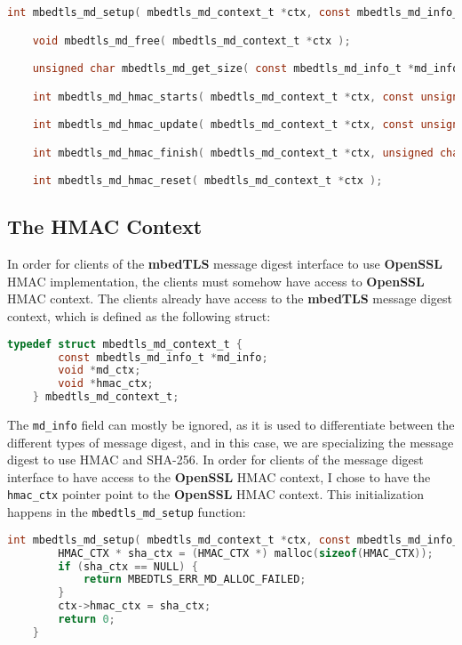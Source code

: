 \documentclass[pageno]{jpaper}
\newcommand{\stdtitle}[1]{\textbf{#1}}
\begin{document}
\begin{lstlisting}[language=C]
    int mbedtls_md_setup( mbedtls_md_context_t *ctx, const mbedtls_md_info_t *md_info, int hmac );

    void mbedtls_md_free( mbedtls_md_context_t *ctx );

    unsigned char mbedtls_md_get_size( const mbedtls_md_info_t *md_info );

    int mbedtls_md_hmac_starts( mbedtls_md_context_t *ctx, const unsigned char *key, size_t keylen );

    int mbedtls_md_hmac_update( mbedtls_md_context_t *ctx, const unsigned char *input, size_t ilen );

    int mbedtls_md_hmac_finish( mbedtls_md_context_t *ctx, unsigned char *output);

    int mbedtls_md_hmac_reset( mbedtls_md_context_t *ctx );
\end{lstlisting}

\subsection{The HMAC Context}

In order for clients of the \stdtitle{mbedTLS} message digest interface to use \stdtitle{OpenSSL} HMAC implementation, the clients must somehow have access to \stdtitle{OpenSSL} HMAC context. The clients already have access to the \stdtitle{mbedTLS} message digest context, which is defined as the following struct:

\begin{lstlisting}[language=C]
    typedef struct mbedtls_md_context_t {
        const mbedtls_md_info_t *md_info;
        void *md_ctx;
        void *hmac_ctx;
    } mbedtls_md_context_t;
\end{lstlisting}

The \lstinline{md_info} field can mostly be ignored, as it is used to differentiate between the different types of message digest, and in this case, we are specializing the message digest to use HMAC and SHA-256. In order for clients of the message digest interface to have access to the \stdtitle{OpenSSL} HMAC context, I chose to have the \lstinline{hmac_ctx} pointer point to the \stdtitle{OpenSSL} HMAC context. This initialization happens in the \lstinline{mbedtls_md_setup} function:

\begin{lstlisting}[language=C]
    int mbedtls_md_setup( mbedtls_md_context_t *ctx, const mbedtls_md_info_t *md_info, int hmac ) {
        HMAC_CTX * sha_ctx = (HMAC_CTX *) malloc(sizeof(HMAC_CTX));
        if (sha_ctx == NULL) {
            return MBEDTLS_ERR_MD_ALLOC_FAILED;
        }
        ctx->hmac_ctx = sha_ctx;
        return 0;
    }
\end{lstlisting}
\end{document}
